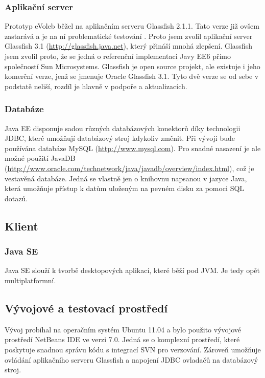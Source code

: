 \documentclass[11pt,twoside,a4paper]{book}
\begin{document}
\subsubsection{Aplikační server} \label{aplikacni_server}

Prototyp eVoleb běžel na aplikačním serveru Glassfish 2.1.1. Tato verze již ovšem zastarává a je na ní problematické testování \cite{www:prototyp}. Proto jsem zvolil aplikační server Glassfish 3.1 (\url{http://glassfish.java.net}), který přináší mnohá zlepšení. Glassfish jsem zvolil proto, že se jedná o referenční implementaci Javy EE6 přímo společností Sun Microsystems. Glassfish je open source projekt, ale existuje i jeho komerční verze, jenž se jmenuje Oracle Glassfish 3.1. Tyto dvě verze se od sebe v podstatě neliší, rozdíl je hlavně v podpoře a aktualizacích.

\subsubsection{Databáze}

Java EE disponuje sadou různých databázových konektorů díky technologii JDBC, které umožňují databázový stroj kdykoliv změnit. Při vývoji bude používána databáze MySQL (\url{http://www.mysql.com}). Pro snadné nasazení je ale možné použití JavaDB (\url{http://www.oracle.com/technetwork/java/javadb/overview/index.html}), což je vestavěná databáze. Jedná se vlastně jen o knihovnu napsanou v jazyce Java, která umožňuje přístup k datům uloženým na pevném disku za pomoci SQL dotazů.

\subsection{Klient}

\subsubsection{Java SE}

Java SE slouží k tvorbě desktopových aplikací, které běží pod JVM. Je tedy opět multiplatformní.

\subsection{Vývojové a testovací prostředí}

Vývoj probíhal na operačním systém Ubuntu 11.04 a bylo použito vývojové prostředí NetBeans IDE ve verzi 7.0. Jedná se o komplexní prostředí, které poskytuje snadnou správu kódu s integrací SVN pro verzování. Zároveň umožňuje ovládání aplikačního serveru Glassfish a napojení JDBC ovladačů na databázový stroj.
\end{document}
